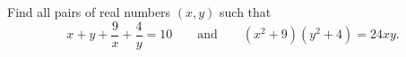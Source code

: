 Find all pairs of real numbers $(x,y)$ such that
\[
x+y+\dfrac{9}{x}+\dfrac{4}{y}=10\qquad\text{and}\qquad (x^2+9)(y^2+4)=24xy .
\]
